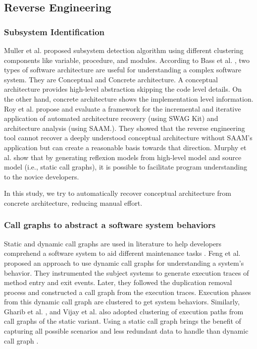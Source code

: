 \subsection{Reverse Engineering}

\subsubsection{Subsystem Identification}
Muller et al. \cite{muller1990composingSubsystemStructures} proposed subsystem detection algorithm using different clustering components like variable, procedure, and modules. 
According to Bass et al. \cite{bass2003softwareArchitecturePractice}, two types of software architecture are useful for understanding a complex software system. They are Conceptual and Concrete architecture. A conceptual architecture provides high-level abstraction skipping the code level details. On the other hand, concrete architecture shows the implementation level information. Roy et al. \cite{roy2008softwareArchitectureRecovery} propose and evaluate a framework for the incremental and iterative application of automated architecture recovery (using SWAG Kit) and architecture analysis (using SAAM.). They showed that the reverse engineering tool cannot recover a deeply understood conceptual architecture without SAAM's application but can create a reasonable basis towards that direction. Murphy et al.\cite{MurphyNotkin2001} show that by generating reflexion models from high-level model and source model (i.e., static call graphs), it is possible to facilitate program understanding to the novice developers. 

In this study, we try to automatically recover conceptual architecture from concrete architecture, reducing manual effort.

\subsubsection{Call graphs to abstract a software system behaviors}
Static and dynamic call graphs are used in literature to help developers comprehend a software system to aid different maintenance tasks \cite{feng2018hierarchicalExecutionComprehension, gharibi2018automaticStaticCluster, xin2019identifyingFeaturesExecution}. Feng et al. \cite{feng2018hierarchicalExecutionComprehension} proposed an approach to use dynamic call graphs for understanding a system's behavior. They instrumented the subject systems to generate execution traces of method entry and exit events. Later, they followed the duplication removal process and constructed a call graph from the execution traces. Execution phases from this dynamic call graph are clustered to get system behaviors. Similarly, Gharib et al. \cite{gharibi2018automaticStaticCluster}, and Vijay et al. \cite{walunj2019graphevoEvolutionCall} also adopted clustering of execution paths from call graphs of the static variant. Using a static call graph brings the benefit of capturing all possible scenarios and less redundant data to handle than dynamic call graph \cite{gharibi2018automaticStaticCluster}. 

